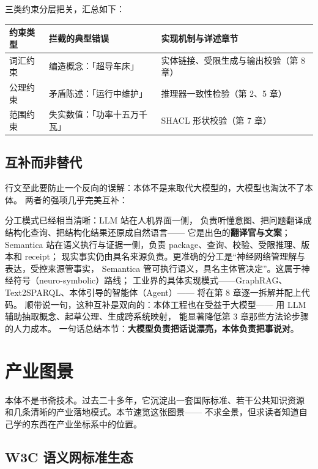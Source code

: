 三类约束分层把关，汇总如下：

\begin{center}
\begin{tabularx}{\linewidth}{@{}lXX@{}}
\toprule
\textbf{约束类型} & \textbf{拦截的典型错误} & \textbf{实现机制与详述章节} \\
\midrule
词汇约束 & 编造概念：「超导车床」 & 实体链接、受限生成与输出校验（第 8 章） \\
公理约束 & 矛盾陈述：「运行中维护」 & 推理器一致性检验（第 2、5 章） \\
范围约束 & 失实数值：「功率十五万千瓦」 & SHACL 形状校验（第 7 章） \\
\bottomrule
\end{tabularx}
\end{center}

\subsection{互补而非替代}

行文至此要防止一个反向的误解：本体不是来取代大模型的，大模型也淘汰不了本体。
两者的强项几乎完美互补：



分工模式已经相当清晰：LLM 站在人机界面一侧，
负责听懂意图、把问题翻译成结构化查询、把结构化结果还原成自然语言——
它是出色的\textbf{翻译官与文案}；
Semantica 站在语义执行与证据一侧，负责 package、查询、校验、受限推理、版本和 receipt；
现实事实仍由具名来源负责。更准确的分工是“神经网络管理解与表达，受控来源管事实，
Semantica 管可执行语义，具名主体管决定”。这属于神经符号（neuro-symbolic）路线；
工业界的具体实现模式——GraphRAG、Text2SPARQL、本体引导的智能体（Agent）——
将在第 8 章逐一拆解并配上代码。
顺带说一句，这种互补是双向的：本体工程也在受益于大模型——
用 LLM 辅助抽取概念、起草公理、生成跨系统映射，
能显著降低第 3 章那些方法论步骤的人力成本。
一句话总结本节：\textbf{大模型负责把话说漂亮，本体负责把事说对}。

\section{产业图景}

本体不是书斋技术。过去二十多年，它沉淀出一套国际标准、若干公共知识资源
和几条清晰的产业落地模式。本节速览这张图景——
不求全景，但求读者知道自己学的东西在产业坐标系中的位置。

\subsection{W3C 语义网标准生态}

